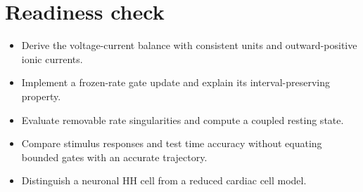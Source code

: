 \documentclass[11pt,letterpaper]{article}
\theoremstyle{definition}\newtheorem{definition}{Definition}\newtheorem{example}{Example}
\numberwithin{equation}{section}
\begin{document}
\section*{Readiness check}
\begin{itemize}
\item Derive the voltage-current balance with consistent units and outward-positive ionic currents.
\item Implement a frozen-rate gate update and explain its interval-preserving property.
\item Evaluate removable rate singularities and compute a coupled resting state.
\item Compare stimulus responses and test time accuracy without equating bounded gates with an accurate trajectory.
\item Distinguish a neuronal HH cell from a reduced cardiac cell model.
\end{itemize}
\end{document}
